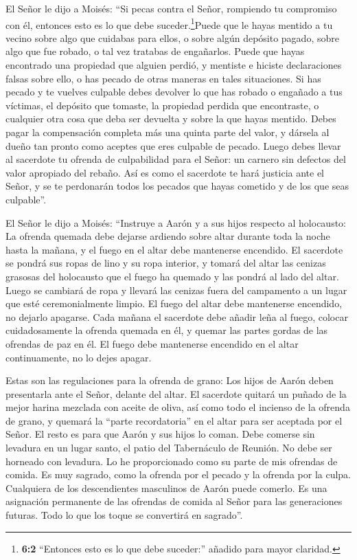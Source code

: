  El Señor le dijo a Moisés:  ``Si pecas contra
el Señor, rompiendo tu compromiso con él, entonces esto es lo que debe
suceder.\footnote{\textbf{6:2} ``Entonces esto es lo que debe suceder:''
  añadido para mayor claridad.}Puede que le hayas mentido a tu vecino
sobre algo que cuidabas para ellos, o sobre algún depósito pagado, sobre
algo que fue robado, o tal vez tratabas de engañarlos. 
Puede que hayas encontrado una propiedad que alguien perdió, y mentiste
e hiciste declaraciones falsas sobre ello, o has pecado de otras maneras
en tales situaciones.  Si has pecado y te vuelves culpable
debes devolver lo que has robado o engañado a tus víctimas, el depósito
que tomaste, la propiedad perdida que encontraste,  o
cualquier otra cosa que deba ser devuelta y sobre la que hayas mentido.
Debes pagar la compensación completa más una quinta parte del valor, y
dársela al dueño tan pronto como aceptes que eres culpable de pecado.
 Luego debes llevar al sacerdote tu ofrenda de culpabilidad
para el Señor: un carnero sin defectos del valor apropiado del rebaño.
 Así es como el sacerdote te hará justicia ante el Señor, y
se te perdonarán todos los pecados que hayas cometido y de los que seas
culpable''.

 El Señor le dijo a Moisés:  ``Instruye a Aarón
y a sus hijos respecto al holocausto: La ofrenda quemada debe dejarse
ardiendo sobre altar durante toda la noche hasta la mañana, y el fuego
en el altar debe mantenerse encendido.  El sacerdote se
pondrá sus ropas de lino y su ropa interior, y tomará del altar las
cenizas grasosas del holocausto que el fuego ha quemado y las pondrá al
lado del altar.  Luego se cambiará de ropa y llevará las
cenizas fuera del campamento a un lugar que esté ceremonialmente limpio.
 El fuego del altar debe mantenerse encendido, no dejarlo
apagarse. Cada mañana el sacerdote debe añadir leña al fuego, colocar
cuidadosamente la ofrenda quemada en él, y quemar las partes gordas de
las ofrendas de paz en él.  El fuego debe mantenerse
encendido en el altar continuamente, no lo dejes apagar.

 Estas son las regulaciones para la ofrenda de grano: Los
hijos de Aarón deben presentarla ante el Señor, delante del altar.
 El sacerdote quitará un puñado de la mejor harina mezclada
con aceite de oliva, así como todo el incienso de la ofrenda de grano, y
quemará la ``parte recordatoria'' en el altar para ser aceptada por el
Señor.  El resto es para que Aarón y sus hijos lo coman.
Debe comerse sin levadura en un lugar santo, el patio del Tabernáculo de
Reunión.  No debe ser horneado con levadura. Lo he
proporcionado como su parte de mis ofrendas de comida. Es muy sagrado,
como la ofrenda por el pecado y la ofrenda por la culpa. 
Cualquiera de los descendientes masculinos de Aarón puede comerlo. Es
una asignación permanente de las ofrendas de comida al Señor para las
generaciones futuras. Todo lo que los toque se convertirá en sagrado''.

